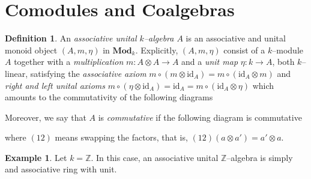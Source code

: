 \documentclass{article}
\theoremstyle{plain}
\theoremstyle{definition}
\newtheorem{Def}[Th]{Definition}
\newtheorem{Ex}[Th]{Example}
\begin{document}
\section{Comodules and Coalgebras}

\begin{Def}
    An \textit{associative unital $k$--algebra $A$} is an associative and unital monoid object $(A,m,\eta)$ in $\textbf{Mod}_k$. Explicitly, $(A,m,\eta)$ consist of  a $k$--module $A$ together with a \textit{multiplication} $m\colon A\otimes A\to A$ and a \textit{unit map} $\eta\colon k\to A$, both $k$--linear,  satisfying the \textit{associative axiom} $m\circ (m\otimes\mathrm{id}_A)=m\circ(\mathrm{id}_A\otimes m)$ and \textit{right and left unital axioms} $m\circ (\eta \otimes \mathrm{id}_A)=\mathrm{id}_A=m\circ(\mathrm{id}_A\otimes \eta)$ which amounts to the commutativity of the following diagrams 
     \begin{center}
    \end{center}
Moreover, we say that $A$ is \textit{commutative} if the following diagram is commutative
\begin{center}
    \end{center}
    where $(12)$ means swapping the factors, that is, $(12)(a\otimes a')=a'\otimes a$.  
\end{Def}

\begin{Ex}
    Let $k=\mathbb{Z}$. In this case, an associative unital $\mathbb{Z}$--algebra is simply and associative ring with unit.
\end{Ex}
\end{document}
